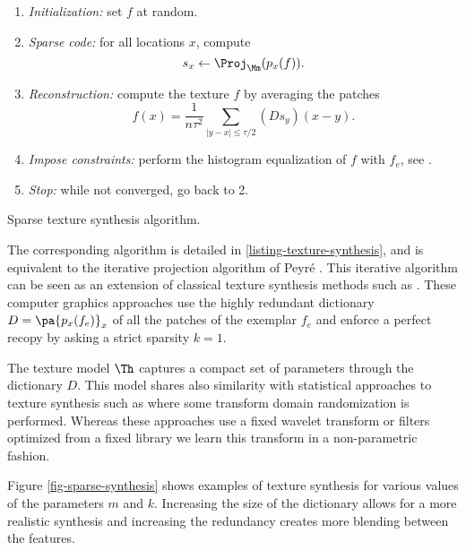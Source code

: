 \begin{listing}
\begin{enumerate}
	\item \textit{Initialization:} set $f$ at random.
	\item \textit{Sparse code:} for all locations $x$, compute
	\begin{equation*}
		s_x \leftarrow \Proj_{\Mm}( p_x(f) ).
	\end{equation*}
	\item \textit{Reconstruction:} compute the texture $f$ by averaging the patches
		\begin{equation*}
			f(x) = \frac{1}{n \tau^2} \sum_{|y-x| \leq \tau/2} (D s_y)(x-y).
		\end{equation*}
	\item \textit{Impose constraints:} perform the histogram equalization of $f$ with $f_e$, see \cite{peyre-sparse-textures}.
	\item \textit{Stop:} while not converged, go back to 2. 
\end{enumerate}%
    \caption{Sparse texture synthesis algorithm. \label{listing-texture-synthesis}}
\end{listing}


The corresponding algorithm is detailed in \ref{listing-texture-synthesis}, and is equivalent to the iterative projection algorithm of Peyr\'e \cite{peyre-sparse-textures}. This iterative algorithm can be seen as an extension of classical texture synthesis methods such as \cite{efros-nonparam-sampling,wei-texture-synthesis}. These computer graphics approaches use the highly redundant dictionary $D = \pa{p_x(f_e)}_x$ of all the patches of the exemplar $f_e$ and enforce a perfect recopy by asking a strict sparsity $k=1$. 

The texture model $\Th$ captures a compact set of parameters through the dictionary $D$. This model shares also similarity with statistical approaches to texture synthesis such as \cite{heeger-pyramid-texture,zhu-frame,portilla-parametric-model} where some transform domain randomization is performed. Whereas these approaches use a fixed wavelet transform \cite{heeger-pyramid-texture,portilla-parametric-model} or filters optimized from a fixed library \cite{zhu-frame} we learn this transform in a non-parametric fashion.
 
Figure \ref{fig-sparse-synthesis} shows examples of texture synthesis for various values of the parameters $m$ and $k$. Increasing the size of the dictionary allows for a more realistic synthesis and increasing the redundancy creates more blending between the features.

